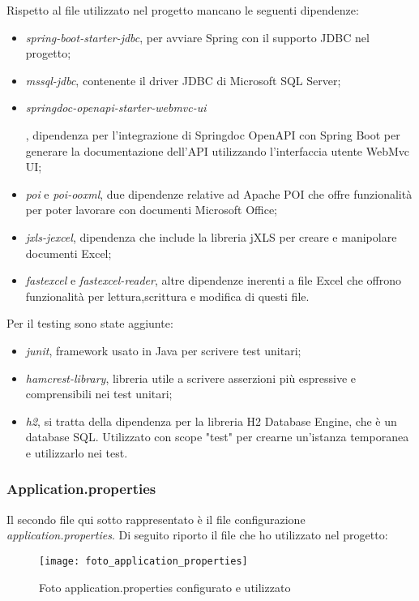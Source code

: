 Rispetto al file utilizzato nel progetto mancano le seguenti dipendenze:
\begin{itemize}
\item \textit{spring-boot-starter-jdbc}, per avviare Spring con il supporto JDBC nel progetto;
\item \textit{mssql-jdbc}, contenente il driver JDBC di Microsoft SQL Server;
\item \hypertarget{doc-api}{\textit{springdoc-openapi-starter-webmvc-ui}}, dipendenza per l'integrazione di Springdoc OpenAPI con Spring Boot per generare la documentazione dell'API utilizzando l'interfaccia utente WebMvc UI;
\item \textit{poi} e \textit{poi-ooxml}, due dipendenze relative ad Apache POI che offre funzionalità per poter lavorare con documenti Microsoft Office;
\item \textit{jxls-jexcel}, dipendenza che include la libreria jXLS per creare e manipolare documenti Excel;
\item \textit{fastexcel} e \textit{fastexcel-reader}, altre dipendenze inerenti a file Excel che offrono funzionalità per lettura,scrittura e modifica di questi file.
\end{itemize}
Per il testing sono state aggiunte:
\begin{itemize}
\item \textit{junit}, framework usato in Java per scrivere test unitari;
\item \textit{hamcrest-library}, libreria utile a scrivere asserzioni più espressive e comprensibili nei test unitari;
\item \textit{h2}, si tratta della dipendenza per la libreria H2 Database Engine, che è un database SQL. Utilizzato con scope "test" per crearne un'istanza temporanea e utilizzarlo nei test.
\end{itemize}

\subsubsection{Application.properties}
\noindent Il secondo file qui sotto rappresentato è il file configurazione \textit{application.properties}. Di seguito riporto il file che ho utilizzato nel progetto:
\begin{figure}[H] 
    \centering 
    \texttt{[image: foto\_application\_properties]} 
    \caption{Foto application.properties configurato e utilizzato}
\end{figure}


